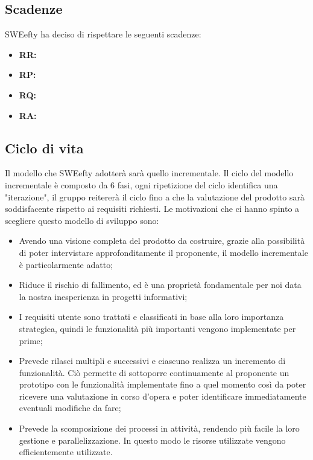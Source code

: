 	\subsection{Scadenze}
	SWEefty ha deciso di rispettare le seguenti scadenze:
	\begin{itemize}
		\item \textbf{RR:}
		\item \textbf{RP:}
		\item \textbf{RQ:}
		\item \textbf{RA:}
	\end{itemize}
	\subsection{Ciclo di vita}
	Il modello che SWEefty adotterà sarà quello incrementale. Il ciclo del modello incrementale è composto da 6 fasi, ogni ripetizione del ciclo identifica una "iterazione", il gruppo reitererà il ciclo fino a che la valutazione del prodotto sarà soddisfacente rispetto ai requisiti richiesti.
	Le motivazioni che ci hanno spinto a scegliere questo modello di sviluppo sono:
	\begin{itemize}
		\item Avendo una visione completa del prodotto da costruire, grazie alla possibilità di poter intervistare approfonditamente il proponente, il modello incrementale è particolarmente adatto;
		\item Riduce il rischio di fallimento, ed è una proprietà fondamentale per noi data la nostra inesperienza in progetti informativi;
		\item I requisiti utente sono trattati e classificati in base alla loro importanza strategica, quindi le funzionalità più importanti vengono implementate per prime;
		\item Prevede rilasci multipli e successivi e ciascuno realizza un incremento di funzionalità. Ciò permette di sottoporre continuamente al proponente un prototipo con le funzionalità implementate fino a quel momento così da poter ricevere una valutazione in corso d'opera e poter identificare immediatamente eventuali modifiche da fare;
		\item Prevede la scomposizione dei processi in attività, rendendo più facile la loro gestione e parallelizzazione. In questo modo le risorse utilizzate vengono efficientemente utilizzate.
	\end{itemize}
